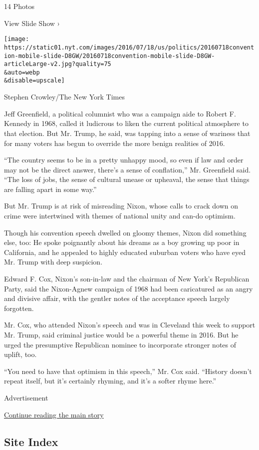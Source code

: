 14 Photos

View Slide Show ›

\texttt{[image: https://static01.nyt.com/images/2016/07/18/us/politics/20160718convention-mobile-slide-D8GW/20160718convention-mobile-slide-D8GW-articleLarge-v2.jpg?quality=75\\\&auto=webp\\\&disable=upscale]}

Stephen Crowley/The New York Times

Jeff Greenfield, a political columnist who was a campaign aide to Robert
F. Kennedy in 1968, called it ludicrous to liken the current political
atmosphere to that election. But Mr. Trump, he said, was tapping into a
sense of wariness that for many voters has begun to override the more
benign realities of 2016.

``The country seems to be in a pretty unhappy mood, so even if law and
order may not be the direct answer, there's a sense of conflation,'' Mr.
Greenfield said. ``The loss of jobs, the sense of cultural unease or
upheaval, the sense that things are falling apart in some way.''

But Mr. Trump is at risk of misreading Nixon, whose calls to crack down
on crime were intertwined with themes of national unity and can-do
optimism.

Though his convention speech dwelled on gloomy themes, Nixon did
something else, too: He spoke poignantly about his dreams as a boy
growing up poor in California, and he appealed to highly educated
suburban voters who have eyed Mr. Trump with deep suspicion.

Edward F. Cox, Nixon's son-in-law and the chairman of New York's
Republican Party, said the Nixon-Agnew campaign of 1968 had been
caricatured as an angry and divisive affair, with the gentler notes of
the acceptance speech largely forgotten.

Mr. Cox, who attended Nixon's speech and was in Cleveland this week to
support Mr. Trump, said criminal justice would be a powerful theme in
2016. But he urged the presumptive Republican nominee to incorporate
stronger notes of uplift, too.

``You need to have that optimism in this speech,'' Mr. Cox said.
``History doesn't repeat itself, but it's certainly rhyming, and it's a
softer rhyme here.''

Advertisement

\protect\hyperlink{after-bottom}{Continue reading the main story}

\hypertarget{site-index}{%
\subsection{Site Index}\label{site-index}}

